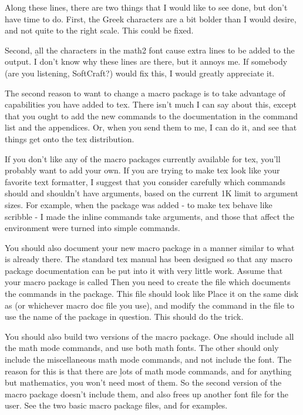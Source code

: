 Along these lines, there are two things that I would like to see
done, but don't have time to do. First, the Greek characters are
a bit bolder than I would desire, and not quite to the right
scale. This could be fixed.

Second, {\b all} the characters in the math2 font cause extra
lines to be added to the output. I don't know why these lines are
there, but it annoys me. If somebody (are you listening,
SoftCraft?) would fix this, I would greatly appreciate it.


The second reason to want to change a macro package is to take
advantage of capabilities you have added to tex. There isn't much
I can say about this, except that you ought to add the new
commands to the documentation in the command list and the
appendices. Or, when you send them to me, I can do it, and see
that things get onto the tex distribution.


If you don't like any of the macro packages currently available
for tex, you'll probably want to add your own. If you are trying
to make tex look like your favorite text formatter, I suggest
that you consider carefully which commands should and shouldn't
have arguments, based on the current 1K limit to argument sizes.
For example, when the  package was added - to
make tex behave like scribble - I made the 
inline commands take arguments, and those that affect the
environment were turned into simple commands.


You should also document your new macro package in a manner
similar to what is already there. The standard tex manual has
been designed so that any macro package documentation can be put
into it with very little work. Assume that your macro package is
called  Then you need to create the file
 which documents the commands in the package.
This file should look like  Place it on the
same disk as  (or whichever macro doc file
you use), and modify the  command in the file
 to use the name of the package in question.
This should do the trick.

You should also build two versions of the macro package. One
should include all the math mode commands, and use both math
fonts. The other should only include the miscellaneous math mode
commands, and not include the  font. The reason for
this is that there are {\b lots} of math mode commands, and for
anything but mathematics, you won't need most of them. So the
second version of the macro package doesn't include them, and
also frees up another font file for the user. See the two basic
macro package files,  and  for
examples.


